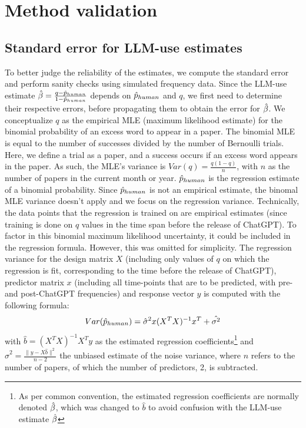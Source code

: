 \section{Method validation}
\subsection{Standard error for LLM-use estimates}
To better judge the reliability of the estimates, we compute the standard error and perform sanity checks using simulated frequency data.
Since the LLM-use estimate $\hat{\beta}=\frac{q -  \hat{p}_{human}}{1-\hat{p}_{human}}$ depends on $\hat{p}_{human}$ and $q$, we first need to determine their respective errors, before propagating them to obtain the error for $\hat{\beta}$.
We conceptualize $q$ as the empirical MLE (maximum likelihood estimate) for the binomial probability of an excess word to appear in a paper.
The binomial MLE is equal to the number of successes divided by the number of Bernoulli trials.
Here, we define a trial as a paper, and a success occurs if an excess word appears in the paper. 
As such, the MLE's variance is $Var(q)=\frac{q(1-q)}{n}$, with $n$ as the number of papers in the current month or year.
$\hat{p}_{human}$ is the regression estimate of a binomial probability. 
Since $\hat{p}_{human}$ is not an empirical estimate, the binomal MLE variance doesn't apply and we focus on the regression variance.
Technically, the data points that the regression is trained on are empirical estimates (since training is done on $q$ values in the time span before the release of ChatGPT).
To factor in this binomial maximum likelihood uncertainty, it could be included in the regression formula.
However, this was omitted for simplicity.
The regression variance for the design matrix $X$ (including only values of $q$ on which the regression is fit, corresponding to the time before the release of ChatGPT), predictor matrix $x$ (including all time-points that are to be predicted, with pre- and post-ChatGPT frequencies) and response vector $y$ is computed with the following formula:
\begin{equation}
    Var(\hat{p}_{human})= \hat{\sigma}^2 x(X^TX)^{-1}x^T + \hat{\sigma^2}
\end{equation}
with $\hat{b}=(X^TX)^{-1}X^Ty$ as the estimated regression coefficients\footnote{As per common convention, the estimated regression coefficients are normally denoted $\hat{\beta}$, which was changed to $\hat{b}$ to avoid confusion with the LLM-use estimate $\hat{\beta}$}
and $\hat{\sigma}^2=\frac{\|y-X\hat{b}\|^2}{n-2}$ the unbiased estimate of the noise variance, where $n$ refers to the number of papers, of which the number of predictors, 2, is subtracted.
